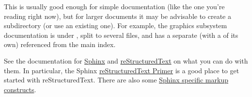 \documentclass[a4paper,8pt,english]{sphinxmanual}
\begin{document}
This is usually good enough for simple documentation (like the one you're
reading right now), but for larger documents it may be advisable to create a
subdirectory (or use an existing one). For example, the graphics subsystem
documentation is under , split to several  files,
and has a separate  (with a  of its own) referenced from
the main index.

See the documentation for \href{http://www.sphinx-doc.org/}{Sphinx} and \href{http://docutils.sourceforge.net/rst.html}{reStructuredText} on what you can do
with them. In particular, the Sphinx \href{http://www.sphinx-doc.org/en/stable/rest.html}{reStructuredText Primer} is a good place
to get started with reStructuredText. There are also some \href{http://www.sphinx-doc.org/en/stable/markup/index.html}{Sphinx specific
markup constructs}.
\end{document}
